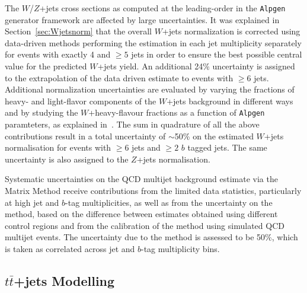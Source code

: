 The $W$/$Z$+jets cross sections as computed at the
leading-order in the
\texttt{Alpgen} generator framework
are affected by large uncertainties.
It was explained in Section~\ref{sec:Wjetsnorm}
that the overall $W$+jets normalization is 
corrected using data-driven methods 
performing the estimation in each jet multiplicity
separately for events with exactly 4 and $\geq 5$ 
jets in order to ensure the best possible central value for the 
predicted $W$+jets yield. 
An additional 24\% uncertainty is assigned to the extrapolation of the data driven
estimate to events with $\geq 6$ jets.
Additional normalization uncertainties are evaluated by varying 
the fractions of heavy- and light-flavor components of the $W$+jets background
in different ways and by studying the $W$+heavy-flavour fractions as
a function of \texttt{Alpgen} paramteters,
as explained in~\cite{topcommon2013}.
The sum in quadrature of all the above contributions result in a 
total uncertainty of $\sim$50\% on
the estimated $W$+jets normalisation for events 
with $\geq 6$ jets and $\geq 2$ $b$ tagged jets. 
The same uncertainty is also assigned to the $Z$+jets normalisation.

Systematic uncertainties on the QCD multijet background 
estimate via the Matrix Method receive
contributions from the limited data statistics, 
particularly at high jet and $b$-tag multiplicities, as
well as from the uncertainty on the method, based on 
the difference between estimates obtained using 
different control regions and from the calibration 
of the method using simulated QCD multijet events.
The uncertainty due to the method is assessed to be 
50\%, which is taken as correlated across jet
and $b$-tag multiplicity bins. 




\subsection{$t\bar{t}$+jets Modelling}
\label{sec:syst_ttbarmodelHTX}

